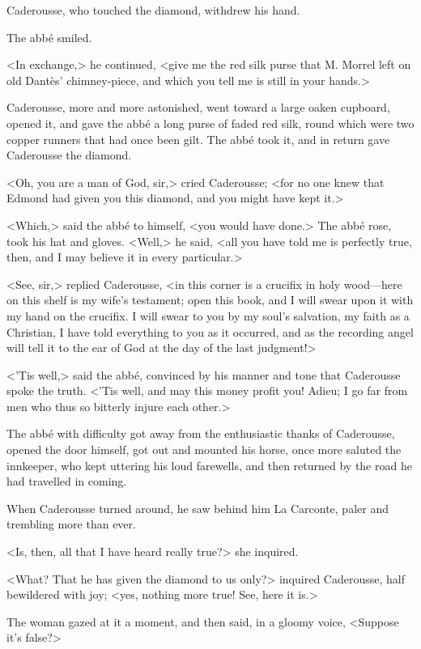  Caderousse, who touched the diamond, withdrew his hand. 

 The abbé smiled. 

 <In exchange,> he continued, <give me the red silk purse that M. Morrel left on old Dantès' chimney-piece, and which you tell me is still in your hands.> 

 Caderousse, more and more astonished, went toward a large oaken cupboard, opened it, and gave the abbé a long purse of faded red silk, round which were two copper runners that had once been gilt. The abbé took it, and in return gave Caderousse the diamond. 

 <Oh, you are a man of God, sir,> cried Caderousse; <for no one knew that Edmond had given you this diamond, and you might have kept it.> 

 <Which,> said the abbé to himself, <you would have done.> The abbé rose, took his hat and gloves. <Well,> he said, <all you have told me is perfectly true, then, and I may believe it in every particular.> 

 <See, sir,> replied Caderousse, <in this corner is a crucifix in holy wood—here on this shelf is my wife's testament; open this book, and I will swear upon it with my hand on the crucifix. I will swear to you by my soul's salvation, my faith as a Christian, I have told everything to you as it occurred, and as the recording angel will tell it to the ear of God at the day of the last judgment!> 

 <'Tis well,> said the abbé, convinced by his manner and tone that Caderousse spoke the truth. <'Tis well, and may this money profit you! Adieu; I go far from men who thus so bitterly injure each other.> 

 The abbé with difficulty got away from the enthusiastic thanks of Caderousse, opened the door himself, got out and mounted his horse, once more saluted the innkeeper, who kept uttering his loud farewells, and then returned by the road he had travelled in coming. 

 When Caderousse turned around, he saw behind him La Carconte, paler and trembling more than ever. 

 <Is, then, all that I have heard really true?> she inquired. 

 <What? That he has given the diamond to us only?> inquired Caderousse, half bewildered with joy; <yes, nothing more true! See, here it is.> 

 The woman gazed at it a moment, and then said, in a gloomy voice, <Suppose it's false?> 

